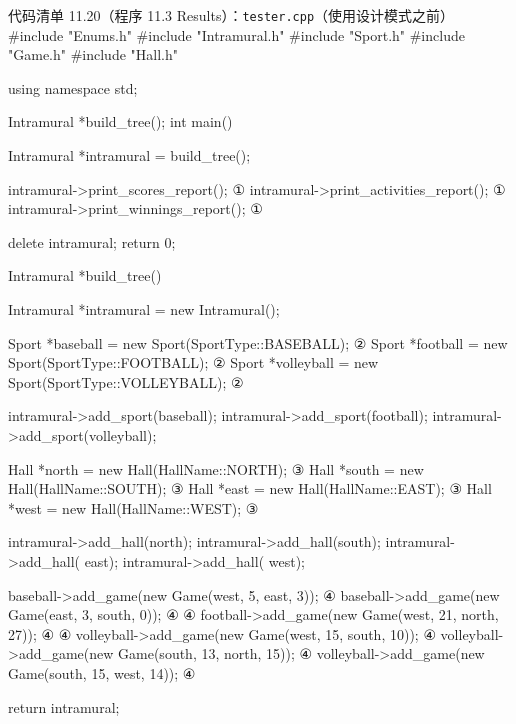 \begin{codeboxt}{代码清单 11.20（程序 11.3 Results）：\texttt{tester.\allowbreak{}cpp}（使用设计模式之前）}
#include "Enums.h"
#include "Intramural.h"
#include "Sport.h"
#include "Game.h"
#include "Hall.h"

using namespace std;

Intramural *build_tree();
int main()
{
    Intramural *intramural = build_tree();

    intramural->print_scores_report();                        ①
    intramural->print_activities_report();                    ①
    intramural->print_winnings_report();                      ①

    delete intramural;
    return 0;
}

Intramural *build_tree()
{
    Intramural *intramural = new Intramural();

    Sport *baseball   = new Sport(SportType::BASEBALL);       ②
    Sport *football   = new Sport(SportType::FOOTBALL);       ②
    Sport *volleyball = new Sport(SportType::VOLLEYBALL);     ②

    intramural->add_sport(baseball);
    intramural->add_sport(football);
    intramural->add_sport(volleyball);

    Hall *north = new Hall(HallName::NORTH);                  ③
    Hall *south = new Hall(HallName::SOUTH);                  ③
    Hall *east  = new Hall(HallName::EAST);                   ③
    Hall *west  = new Hall(HallName::WEST);                   ③

    intramural->add_hall(north);
    intramural->add_hall(south);
    intramural->add_hall( east);
    intramural->add_hall( west);

    baseball->add_game(new Game(west, 5, east, 3));           ④
    baseball->add_game(new Game(east, 3, south, 0));          ④
                                                              ④
    football->add_game(new Game(west, 21, north, 27));        ④
                                                              ④
    volleyball->add_game(new Game(west,  15, south, 10));     ④
    volleyball->add_game(new Game(south, 13, north, 15));     ④
    volleyball->add_game(new Game(south, 15, west,  14));     ④

    return intramural;
}
\end{codeboxt}
\par
{}\par
{}\par
{}\par

